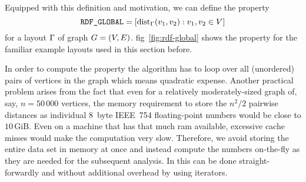 \documentclass{graphstudy}
\begin{document}
Equipped with this definition and motivation, we can define the property
\begin{equation}
  \mbox{\text{\upshape\ttfamily RDF\_GLOBAL}} = \left[\operatorname{dist}_\Gamma(v_1,v_2):{}v_1,v_2\in V\right]
\end{equation}
for a layout \(\Gamma\) of graph \(G=(V,E)\).  \Acl{fig}~\ref{fig:rdf-global} shows the  property
for the familiar example layouts used in this section before.

\begin{Figure}
  \caption[ examples]{%
    Distributions for the  property shown for the three example layouts.  The \acs*{rdf} for the
    regular grid shows that \(g(r)=0\) for \(r<100\) with a distinguished peak at \(r=100\) corresponding to the closest
    distance in the lattice.  The next peak at \(r=100\times\sqrt{2}\) corresponds to the next larger (diagonal)
    distance.  Large double peaks around \(r=200\) and \(r=300\) are caused by the even more frequently occurring
    distances to vertices two or three cells away respectively as well as the distances of \(r\approx224\) and
    \(r\approx283\) which correspond to the diagonals of \(2\times1\) and \(2\times2\) cells respectively.  As the
    radius increases, more and more peaks become visible until the distribution starts to decay again due to the finite
    graph size before a continuum is reached.  The \acs*{rdf} of the distorted grid resembles the basic structure of
    that for the regular grid but features \enquote{fingers} superimposed on a large base signal instead of distinctive
    sharp peaks.  The peaks at the radii discussed before can still be clearly identified, though.  The \acs*{rdf} for
    the force-directed layout of the larger graph at the right makes it hard to identify any significant features except
    for the clearly visible peak at \(r=100\) caused by the many single-edge distances along the more or less regular
    strands of nodes.
  }
  \label{fig:rdf-global}
\end{Figure}

In order to compute the property  the algorithm has to loop over all (unordered) pairs of vertices in
the graph which means quadratic expense.  Another practical problem arises from the fact that even for a relatively
moderately-sized graph of, say, \(n=50\,000\) vertices, the memory requirement to store the \(n^2/2\) pairwise distances
as individual 8~byte IEEE~754 floating-point numbers would be close to \(10\,\text{GiB}\).  Even on a machine that has
that much \acs{ram} available, excessive cache misses would make the computation very slow.  Therefore, we avoid storing
the entire data set in memory at once and instead compute the numbers on-the-fly as they are needed for the subsequent
analysis.  In {\CXX} this can be done straight-forwardly and without additional overhead by using iterators.
\end{document}
